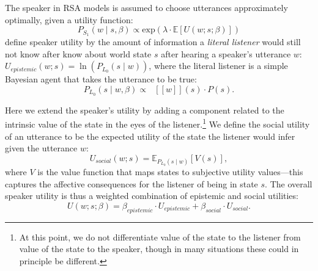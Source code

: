 \documentclass[10pt,letterpaper]{article}
\newcommand{\denote}[1]{\mbox{ $[\![ #1 ]\!]$}}
\newcommand{\ndg}[1]{\textcolor{Green}{[ndg: #1]}}
\begin{document}
The speaker in RSA models is assumed to choose utterances approximately optimally, given a utility function:
\begin{equation}
P_{S_1}(w \mid s, \beta) \propto \mathrm{exp}(\lambda \cdot \mathbb{E}[U(w; s; \beta)])\label{eq:S1}
\end{equation}
 define speaker utility by the amount of information a \emph{literal listener} would still not know after know about world state $s$ after hearing a speaker's utterance $w$:
$U_{epistemic}(w; s) = \ln(P_{L_0}(s \mid w)) $,
where the literal listener is a simple Bayesian agent that takes the utterance to be true:
\begin{equation}
P_{L_0}(s \mid w, \beta)\propto \denote{w}(s) \cdot P(s) \label{eq:L0}.
\end{equation}

Here we extend the speaker's utility by adding a component related to the intrinsic value of the state in the eyes of the listener.\footnote{At this point, we do not differentiate value of the state to the listener from value of the state to the speaker, though in many situations these could in principle be different.}
%
We define the social utility of an utterance to be the expected utility of the state the listener would infer given the utterance $w$:
%
$$
U_{social}(w; s) = \mathbb{E}_{P_{L_0}(s \mid w)}[V(s)],
$$
%
where $V$ is the value function that maps states to subjective utility values---this captures the affective consequences for the listener of being in state $s$.
The overall speaker utility is thus a weighted combination of epistemic and social utilities:
$$
U(w;s; \beta) = \beta_{epistemic}\cdot U_{epistemic} + \beta_{social} \cdot U_{social}.
$$
%
%
\end{document}
